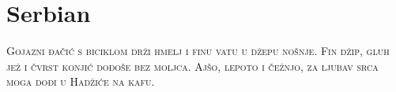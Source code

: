 

\presection\section*{\checkno Serbian}\postsection

\noindent\textsc{Gojazni đačić s biciklom drži hmelj i finu vatu u džepu nošnje.
Fin džip, gluh jež i čvrst konjić dođoše bez moljca.
Ajšo, lepoto i čežnjo, za ljubav srca moga dođi u Hadžiće na kafu.}